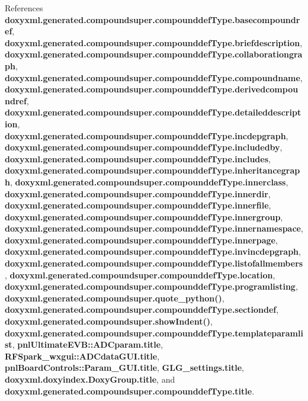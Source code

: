 References {\bf doxyxml.\+generated.\+compoundsuper.\+compounddef\+Type.\+basecompoundref}, {\bf doxyxml.\+generated.\+compoundsuper.\+compounddef\+Type.\+briefdescription}, {\bf doxyxml.\+generated.\+compoundsuper.\+compounddef\+Type.\+collaborationgraph}, {\bf doxyxml.\+generated.\+compoundsuper.\+compounddef\+Type.\+compoundname}, {\bf doxyxml.\+generated.\+compoundsuper.\+compounddef\+Type.\+derivedcompoundref}, {\bf doxyxml.\+generated.\+compoundsuper.\+compounddef\+Type.\+detaileddescription}, {\bf doxyxml.\+generated.\+compoundsuper.\+compounddef\+Type.\+incdepgraph}, {\bf doxyxml.\+generated.\+compoundsuper.\+compounddef\+Type.\+includedby}, {\bf doxyxml.\+generated.\+compoundsuper.\+compounddef\+Type.\+includes}, {\bf doxyxml.\+generated.\+compoundsuper.\+compounddef\+Type.\+inheritancegraph}, {\bf doxyxml.\+generated.\+compoundsuper.\+compounddef\+Type.\+innerclass}, {\bf doxyxml.\+generated.\+compoundsuper.\+compounddef\+Type.\+innerdir}, {\bf doxyxml.\+generated.\+compoundsuper.\+compounddef\+Type.\+innerfile}, {\bf doxyxml.\+generated.\+compoundsuper.\+compounddef\+Type.\+innergroup}, {\bf doxyxml.\+generated.\+compoundsuper.\+compounddef\+Type.\+innernamespace}, {\bf doxyxml.\+generated.\+compoundsuper.\+compounddef\+Type.\+innerpage}, {\bf doxyxml.\+generated.\+compoundsuper.\+compounddef\+Type.\+invincdepgraph}, {\bf doxyxml.\+generated.\+compoundsuper.\+compounddef\+Type.\+listofallmembers}, {\bf doxyxml.\+generated.\+compoundsuper.\+compounddef\+Type.\+location}, {\bf doxyxml.\+generated.\+compoundsuper.\+compounddef\+Type.\+programlisting}, {\bf doxyxml.\+generated.\+compoundsuper.\+quote\+\_\+python()}, {\bf doxyxml.\+generated.\+compoundsuper.\+compounddef\+Type.\+sectiondef}, {\bf doxyxml.\+generated.\+compoundsuper.\+show\+Indent()}, {\bf doxyxml.\+generated.\+compoundsuper.\+compounddef\+Type.\+templateparamlist}, {\bf pnl\+Ultimate\+E\+V\+B\+::\+A\+D\+Cparam.\+title}, {\bf R\+F\+Spark\+\_\+wxgui\+::\+A\+D\+Cdata\+G\+U\+I.\+title}, {\bf pnl\+Board\+Controls\+::\+Param\+\_\+\+G\+U\+I.\+title}, {\bf G\+L\+G\+\_\+settings.\+title}, {\bf doxyxml.\+doxyindex.\+Doxy\+Group.\+title}, and {\bf doxyxml.\+generated.\+compoundsuper.\+compounddef\+Type.\+title}.



